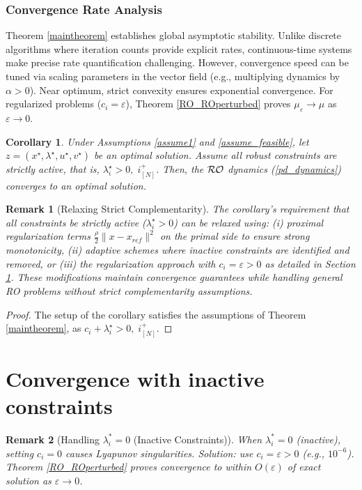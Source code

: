 \documentclass[journal,twoside,web]{ieeecolor}
\newcommand{\rev}[1]{\textcolor{revisionblue}{#1}}
\newtheorem{corollary}{Corollary}
\newtheorem{remark}{Remark}
\begin{document}
\rev{\subsubsection{Convergence Rate Analysis}
Theorem \ref{maintheorem} establishes global asymptotic stability. Unlike discrete algorithms where iteration counts provide explicit rates, continuous-time systems make precise rate quantification challenging. However, convergence speed can be tuned via scaling parameters in the vector field (e.g., multiplying dynamics by $\alpha > 0$). Near optimum, strict convexity ensures exponential convergence. For regularized problems ($c_i = \varepsilon$), Theorem \ref{RO_ROperturbed} proves $\mu_\varepsilon \to \mu$ as $\varepsilon \to 0$.}

\begin{corollary}
Under Assumptions \ref{assume1} and \ref{assume_feasible}, let $z=(x^\star,\lambda^\star,u^\star,v^\star)$ be an optimal solution.
Assume all robust constraints are strictly active, that is, $\lambda_i^\star>0,\;i^+_{[N]}$. Then, the ${\cal RO}$ dynamics (\ref{pd_dynamics}) converges to an optimal solution.
\end{corollary}

\begin{remark}[\rev{Relaxing Strict Complementarity}]
\rev{The corollary's requirement that all constraints be strictly active ($\lambda_i^\star > 0$) can be relaxed using: (i) proximal regularization terms $\frac{\rho}{2}\|x - x_{ref}\|^2$ on the primal side to ensure strong monotonicity, (ii) adaptive schemes where inactive constraints are identified and removed, or (iii) the regularization approach with $c_i = \varepsilon > 0$ as detailed in Section \ref{perturbed_section_pddynamics}. These modifications maintain convergence guarantees while handling general RO problems without strict complementarity assumptions.}
\end{remark}
\begin{proof}
The setup of the corollary satisfies the assumptions of Theorem \ref{maintheorem}, as $c_i+\lambda_i^\star>0,\;i^+_{[N]}$.
\end{proof}


\section{Convergence with inactive constraints} \label{perturbed_section_pddynamics}

\begin{remark}[\rev{Handling $\lambda_i^* = 0$ (Inactive Constraints)}]
\rev{When $\lambda_i^* = 0$ (inactive), setting $c_i = 0$ causes Lyapunov singularities. Solution: use $c_i = \varepsilon > 0$ (e.g., $10^{-6}$). Theorem \ref{RO_ROperturbed} proves convergence to within $O(\varepsilon)$ of exact solution as $\varepsilon \to 0$.}
\end{remark}
\end{document}
